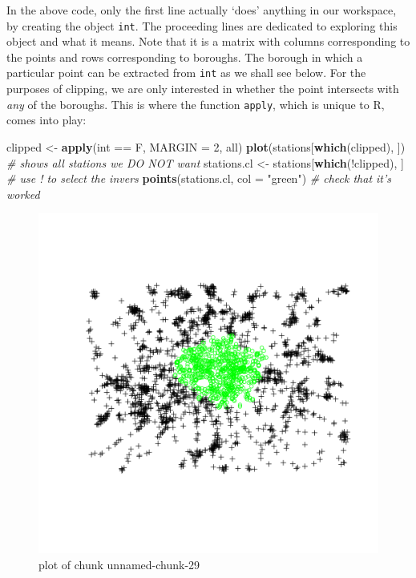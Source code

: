 \documentclass[]{article}
\makeatletter
\newenvironment{Shaded}{}{}
\newcommand{\KeywordTok}[1]{\textcolor[rgb]{0.00,0.44,0.13}{\textbf{{#1}}}}
\newcommand{\DataTypeTok}[1]{\textcolor[rgb]{0.56,0.13,0.00}{{#1}}}
\newcommand{\DecValTok}[1]{\textcolor[rgb]{0.25,0.63,0.44}{{#1}}}
\newcommand{\StringTok}[1]{\textcolor[rgb]{0.25,0.44,0.63}{{#1}}}
\newcommand{\CommentTok}[1]{\textcolor[rgb]{0.38,0.63,0.69}{\textit{{#1}}}}
\newcommand{\NormalTok}[1]{{#1}}
\def\maxwidth{\ifdim\Gin@nat@width>\linewidth\linewidth
\else\Gin@nat@width\fi}
\let\Oldincludegraphics\includegraphics
\renewcommand{\includegraphics}[1]{\Oldincludegraphics[width=\maxwidth]{#1}}
\makeatother
\begin{document}
In the above code, only the first line actually `does' anything in our
workspace, by creating the object \texttt{int}. The proceeding lines are
dedicated to exploring this object and what it means. Note that it is a
matrix with columns corresponding to the points and rows corresponding
to boroughs. The borough in which a particular point can be extracted
from \texttt{int} as we shall see below. For the purposes of clipping,
we are only interested in whether the point intersects with \emph{any}
of the boroughs. This is where the function \texttt{apply}, which is
unique to R, comes into play:

\begin{Shaded}
\begin{Highlighting}[]
\NormalTok{clipped <- }\KeywordTok{apply}\NormalTok{(int == F, }\DataTypeTok{MARGIN =} \DecValTok{2}\NormalTok{, all)}
\KeywordTok{plot}\NormalTok{(stations[}\KeywordTok{which}\NormalTok{(clipped), ])  }\CommentTok{# shows all stations we DO NOT want}
\NormalTok{stations.cl <- stations[}\KeywordTok{which}\NormalTok{(!clipped), ]  }\CommentTok{# use ! to select the invers}
\KeywordTok{points}\NormalTok{(stations.cl, }\DataTypeTok{col =} \StringTok{"green"}\NormalTok{)  }\CommentTok{# check that it's worked}
\end{Highlighting}
\end{Shaded}
\begin{figure}[htbp]
\centering
\includegraphics{figure/unnamed-chunk-29.png}
\caption{plot of chunk unnamed-chunk-29}
\end{figure}
\end{document}
